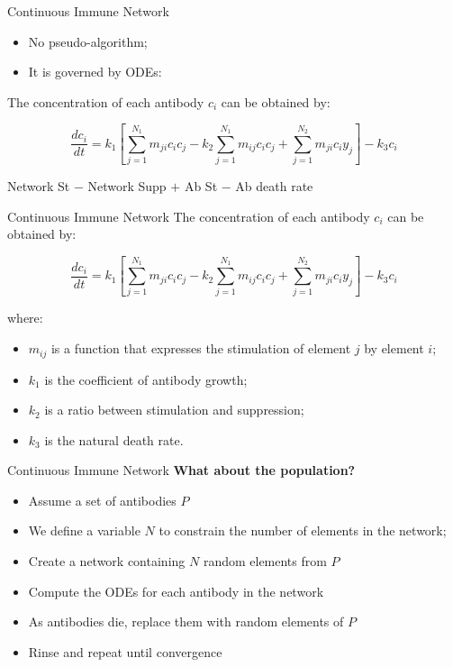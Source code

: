 \documentclass[xcolor=svgnames]{beamer}
\begin{document}
    \begin{frame}{Continuous Immune Network}
        \begin{itemize}
            \item No pseudo-algorithm;
            \item It is governed by ODEs:
        \end{itemize}
        
        The concentration of each antibody $c_{i}$ can be obtained by:
        
        $$ \frac{dc_{i}}{dt} = k_{1} \left[ \sum^{N_{1}}_{j=1}{m_{ji}c_{i}c_{j}} - k_{2} \sum^{N_{1}}_{j=1}{m_{ij}c_{i}c_{j}} + \sum^{N_{2}}_{j=1}{m_{ji}c_{i}y_{j}} \right] - k_{3}c_{i} $$
        
        \center Network St $-$ Network Supp $+$ Ab St $-$ Ab death rate
        
    \end{frame}
    
    \begin{frame}{Continuous Immune Network}
        The concentration of each antibody $c_{i}$ can be obtained by:
        
        $$ \frac{dc_{i}}{dt} = k_{1} \left[ \sum^{N_{1}}_{j=1}{m_{ji}c_{i}c_{j}} - k_{2} \sum^{N_{1}}_{j=1}{m_{ij}c_{i}c_{j}} + \sum^{N_{2}}_{j=1}{m_{ji}c_{i}y_{j}} \right] - k_{3}c_{i} $$
        
        where:
        
        \begin{itemize}
            \item $m_{ij}$ is a function that expresses the stimulation of element $j$ by element $i$;
            \item $k_{1}$ is the coefficient of antibody growth;
            \item $k_{2}$ is a ratio between stimulation and suppression;
            \item $k_{3}$ is the natural death rate.
        \end{itemize}
    \end{frame}
    
    \begin{frame}{Continuous Immune Network}
        \textbf{What about the population?}
        \pause
        
        \vspace{1em}
        \begin{itemize}
            \item Assume a set of antibodies $P$
            \item We define a variable $N$ to constrain the number of elements in the network;
            \item Create a network containing $N$ random elements from $P$
            \item Compute the ODEs for each antibody in the network
            \item As antibodies die, replace them with random elements of $P$
            \item Rinse and repeat until convergence
        \end{itemize}
    \end{frame}
    
\end{document}
